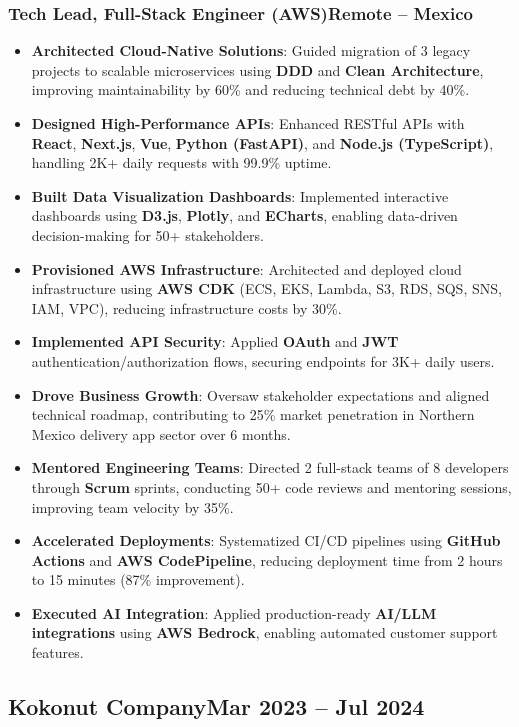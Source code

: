 \documentclass[a4paper,10pt]{article}
\newcommand{\kw}[1]{\textbf{\textcolor{keyword}{#1}}}
\newcommand{\tech}[1]{\textbf{\textcolor{tech}{#1}}}
\begin{document}
\subsubsection*{\small Tech Lead, Full-Stack Engineer (AWS)\hfill Remote -- Mexico}
\begin{itemize}[noitemsep, leftmargin=*]
    \item \textbf{Architected Cloud-Native Solutions}: Guided migration of 3 legacy projects to scalable microservices using \kw{DDD} and \kw{Clean Architecture}, improving maintainability by 60\% and reducing technical debt by 40\%.
    \item \textbf{Designed High-Performance APIs}: Enhanced RESTful APIs with \tech{React}, \tech{Next.js}, \tech{Vue}, \tech{Python (FastAPI)}, and \tech{Node.js (TypeScript)}, handling 2K+ daily requests with 99.9\% uptime.
    \item \textbf{Built Data Visualization Dashboards}: Implemented interactive dashboards using \tech{D3.js}, \tech{Plotly}, and \tech{ECharts}, enabling data-driven decision-making for 50+ stakeholders.
    \item \textbf{Provisioned AWS Infrastructure}: Architected and deployed cloud infrastructure using \tech{AWS CDK} (ECS, EKS, Lambda, S3, RDS, SQS, SNS, IAM, VPC), reducing infrastructure costs by 30\%.
    \item \textbf{Implemented API Security}: Applied \kw{OAuth} and \kw{JWT} authentication/authorization flows, securing endpoints for 3K+ daily users.
    \item \textbf{Drove Business Growth}: Oversaw stakeholder expectations and aligned technical roadmap, contributing to 25\% market penetration in Northern Mexico delivery app sector over 6 months.
    \item \textbf{Mentored Engineering Teams}: Directed 2 full-stack teams of 8 developers through \kw{Scrum} sprints, conducting 50+ code reviews and mentoring sessions, improving team velocity by 35\%.
    \item \textbf{Accelerated Deployments}: Systematized CI/CD pipelines using \tech{GitHub Actions} and \tech{AWS CodePipeline}, reducing deployment time from 2 hours to 15 minutes (87\% improvement).
    \item \textbf{Executed AI Integration}: Applied production-ready \kw{AI/LLM integrations} using \tech{AWS Bedrock}, enabling automated customer support features.
\end{itemize}

\subsection*{\small Kokonut Company\hfill\textbf{Mar 2023 -- Jul 2024}}
\end{document}
